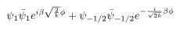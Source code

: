 \begin{equation}
\psi_1\bar{\psi}_{1} e^{i\beta\sqrt{2\over k}\phi}+
\psi_{-1/2}\bar{\psi}_{-1/2}e^{-{i\over 
\sqrt{2k}}\beta\phi}\label{parafpert}
\end{equation}

